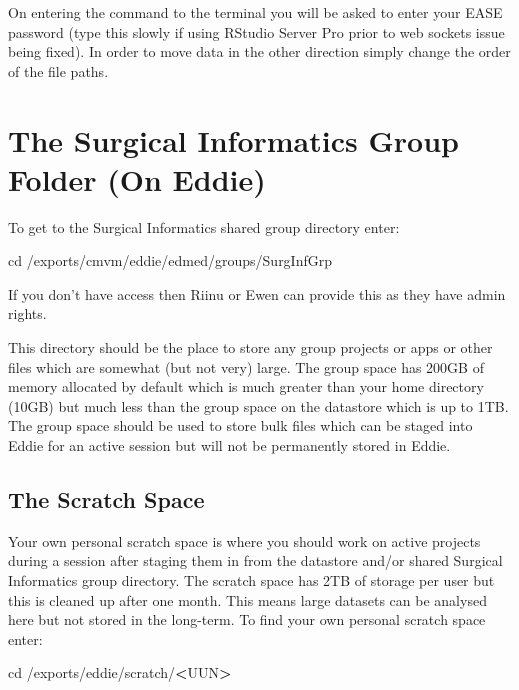 \documentclass[
]{book}
\newenvironment{Shaded}{\begin{snugshade}}{\end{snugshade}}
\newcommand{\BuiltInTok}[1]{#1}
\newcommand{\NormalTok}[1]{#1}
\newcommand{\OperatorTok}[1]{\textcolor[rgb]{0.81,0.36,0.00}{\textbf{#1}}}
\begin{document}
On entering the command to the terminal you will be asked to enter your EASE password (type this slowly if using RStudio Server Pro prior to web sockets issue being fixed). In order to move data in the other direction simply change the order of the file paths.

\hypertarget{the-surgical-informatics-group-folder-on-eddie}{%
\section{The Surgical Informatics Group Folder (On Eddie)}\label{the-surgical-informatics-group-folder-on-eddie}}

To get to the Surgical Informatics shared group directory enter:

\begin{Shaded}
\begin{Highlighting}[]
\BuiltInTok{cd}\NormalTok{ /exports/cmvm/eddie/edmed/groups/SurgInfGrp}
\end{Highlighting}
\end{Shaded}

If you don't have access then Riinu or Ewen can provide this as they have admin rights.

This directory should be the place to store any group projects or apps or other files which are somewhat (but not very) large. The group space has 200GB of memory allocated by default which is much greater than your home directory (10GB) but much less than the group space on the datastore which is up to 1TB. The group space should be used to store bulk files which can be staged into Eddie for an active session but will not be permanently stored in Eddie.

\hypertarget{the-scratch-space}{%
\subsection{The Scratch Space}\label{the-scratch-space}}

Your own personal scratch space is where you should work on active projects during a session after staging them in from the datastore and/or shared Surgical Informatics group directory. The scratch space has 2TB of storage per user but this is cleaned up after one month. This means large datasets can be analysed here but not stored in the long-term. To find your own personal scratch space enter:

\begin{Shaded}
\begin{Highlighting}[]
\BuiltInTok{cd}\NormalTok{ /exports/eddie/scratch/}\OperatorTok{\textless{}}\NormalTok{UUN}\OperatorTok{\textgreater{}}
\end{Highlighting}
\end{Shaded}
\end{document}
